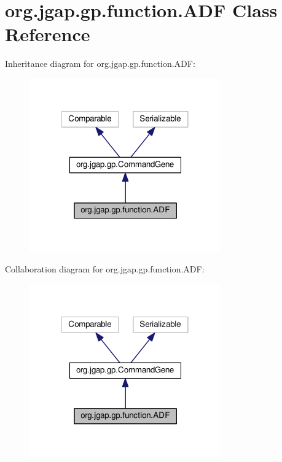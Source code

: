 \hypertarget{classorg_1_1jgap_1_1gp_1_1function_1_1_a_d_f}{\section{org.\-jgap.\-gp.\-function.\-A\-D\-F Class Reference}
\label{classorg_1_1jgap_1_1gp_1_1function_1_1_a_d_f}
}


Inheritance diagram for org.\-jgap.\-gp.\-function.\-A\-D\-F\-:
\nopagebreak
\begin{figure}[H]
\begin{center}
\leavevmode
\includegraphics[width=233pt]{classorg_1_1jgap_1_1gp_1_1function_1_1_a_d_f__inherit__graph}
\end{center}
\end{figure}


Collaboration diagram for org.\-jgap.\-gp.\-function.\-A\-D\-F\-:
\nopagebreak
\begin{figure}[H]
\begin{center}
\leavevmode
\includegraphics[width=233pt]{classorg_1_1jgap_1_1gp_1_1function_1_1_a_d_f__coll__graph}
\end{center}
\end{figure}
